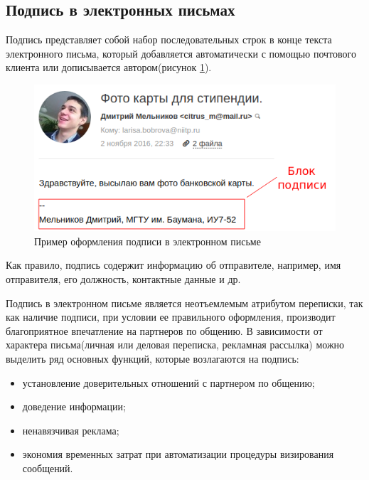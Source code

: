 
\subsection{Подпись в электронных письмах}

Подпись представляет собой набор последовательных строк в конце текста электронного письма, который добавляется автоматически с помощью почтового клиента или дописывается автором(рисунок \ref{anal:sig-example}).

\begin{figure}[h!]
	\centering
	\includegraphics[width=\textwidth]{inc/img/sig-example.png}
	\caption{Пример оформления подписи в электронном письме}
	\label{anal:sig-example}
\end{figure}

Как правило, подпись содержит информацию об отправителе, например, имя отправителя, его должность, контактные данные и др. 

Подпись в электронном письме является неотъемлемым атрибутом переписки, так как наличие подписи, при условии ее правильного оформления, производит благоприятное впечатление на партнеров по общению. 
В зависимости от характера письма(личная или деловая переписка, рекламная рассылка) можно выделить ряд основных функций, которые возлагаются на подпись:

\begin{itemize}
	\item установление доверительных отношений с партнером по общению;
	\item доведение информации;
	\item ненавязчивая реклама;
	\item экономия временных затрат при автоматизации процедуры визирования сообщений. 
\end{itemize}

